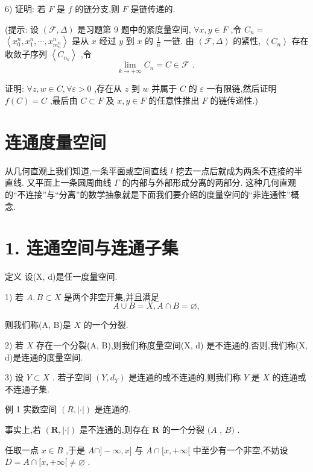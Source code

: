 6) 证明: 若 $F$ 是 $f$ 的链分支,则 $F$ 是链传递的.

(提示: 设 $\left( {\mathcal{F},\Delta }\right)$ 是习题第 9 题中的紧度量空间, $\forall x,y \in  F$ ,令 ${C}_{n} =$  $\left\langle  {{x}_{0}^{n},{x}_{1}^{n},\cdots ,{x}_{{m}_{n}^{n}}^{n}}\right\rangle$ 是从 $x$ 经过 $y$ 到 $x$ 的 $\frac{1}{n}$ 一链. 由 $\left( {\mathcal{F},\Delta }\right)$ 的紧性, $\left\langle  {C}_{n}\right\rangle$ 存在收敛子序列 $\left\langle  {C}_{{n}_{k}}\right\rangle$ ,令
$$\mathop{\lim }\limits_{{k \rightarrow   + \infty }}{C}_{n} = C \in  \mathcal{F}\text{ . }$$

证明: $\forall z,w \in  C,\forall \varepsilon  > 0$ ,存在从 $z$ 到 $w$ 并属于 $C$ 的 $\varepsilon$ 一有限链,然后证明 $f\left( C\right)  = C$ ,最后由 $C \subset  F$ 及 $x,y \in  F$ 的任意性推出 $F$ 的链传递性.)

\section{连通度量空间}

从几何直观上我们知道,一条平面或空间直线 $l$ 挖去一点后就成为两条不连接的半直线. 又平面上一条圆周曲线 $\Gamma$ 的内部与外部形成分离的两部分. 这种几何直观的“不连接”与“分离”的数学抽象就是下面我们要介绍的度量空间的“非连通性”概念.

\section*{1. 连通空间与连通子集}

定义 设(X, d)是任一度量空间.

1) 若 $A,B \subset  X$ 是两个非空开集,并且满足
$$A \cup  B = X,A \cap  B = \varnothing ,$$

则我们称(A, B)是 $X$ 的一个分裂.

2) 若 $X$ 存在一个分裂(A, B),则我们称度量空间(X, d) 是不连通的,否则,我们称(X, d)是连通的度量空间.

3) 设 $Y \subset  X$ . 若子空间 $\left( {Y,{d}_{Y}}\right)$ 是连通的或不连通的,则我们称 $Y$ 是 $X$ 的连通或不连通子集.

例 1 实数空间 $\left( {R,\left| \cdot \right| }\right)$ 是连通的.

事实上,若 $\left( {\mathbf{R},\left| \cdot \right| }\right)$ 是不连通的,则存在 $\mathbf{R}$ 的一个分裂 $(A$ , $B)$ .

任取一点 $x \in  B$ ,于是 $A \cap  \rbrack  - \infty ,x\rbrack$ 与 $A \cap  \lbrack x, + \infty \lbrack$ 中至少有一个非空,不妨设 $D = A \cap  \lbrack x, + \infty \lbrack  \neq  \varnothing$ .

